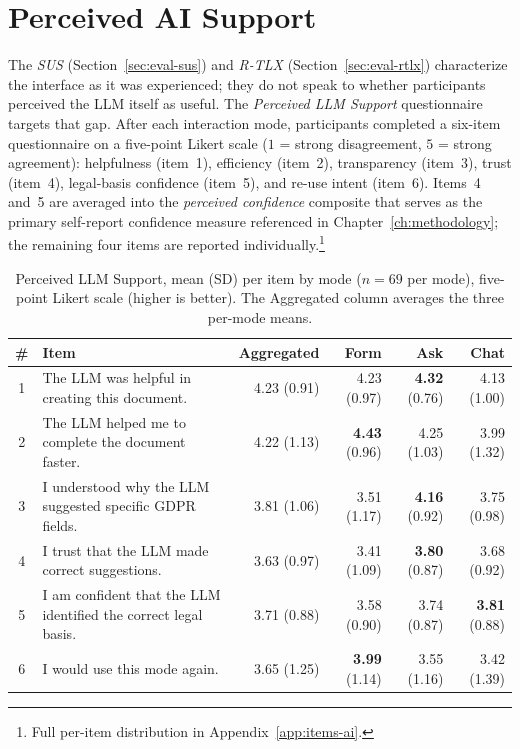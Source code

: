 \section{Perceived AI Support}
\label{sec:eval-ai-support}

The \textit{SUS} (Section~\ref{sec:eval-sus}) and \textit{R-TLX}
(Section~\ref{sec:eval-rtlx}) characterize the interface as it was
experienced; they do not speak to whether participants perceived
the LLM itself as useful.
The \textit{Perceived LLM Support}
questionnaire targets that gap. After each interaction mode,
participants completed a six-item questionnaire on a five-point
Likert scale ($1$ = strong disagreement, $5$ = strong agreement):
helpfulness (item~1), efficiency (item~2), transparency (item~3),
trust (item~4), legal-basis confidence (item~5), and re-use intent
(item~6). Items~4 and~5 are averaged into the \emph{perceived
confidence} composite that serves as the primary self-report
confidence measure referenced in Chapter~\ref{ch:methodology};
the remaining four items are reported individually.\footnote{Full
per-item distribution in Appendix~\ref{app:items-ai}.}

\begin{table}[htbp]
\centering
\small
\begin{tabularx}{\linewidth}{@{}c X r r r r@{}}
\toprule
\# & Item & Aggregated & Form & Ask & Chat \\
\midrule
1 & The LLM was helpful in creating this document. & 4.23 (0.91) & 4.23 (0.97) & \textbf{4.32} (0.76) & 4.13 (1.00) \\
2 & The LLM helped me to complete the document faster. & 4.22 (1.13) & \textbf{4.43} (0.96) & 4.25 (1.03) & 3.99 (1.32) \\
3 & I understood why the LLM suggested specific GDPR fields. & 3.81 (1.06) & 3.51 (1.17) & \textbf{4.16} (0.92) & 3.75 (0.98) \\
4 & I trust that the LLM made correct suggestions. & 3.63 (0.97) & 3.41 (1.09) & \textbf{3.80} (0.87) & 3.68 (0.92) \\
5 & I am confident that the LLM identified the correct legal basis. & 3.71 (0.88) & 3.58 (0.90) & 3.74 (0.87) & \textbf{3.81} (0.88) \\
6 & I would use this mode again. & 3.65 (1.25) & \textbf{3.99} (1.14) & 3.55 (1.16) & 3.42 (1.39) \\
\bottomrule
\end{tabularx}
\caption{Perceived LLM Support, mean (SD) per item by mode
($n = 69$ per mode), five-point Likert scale (higher is better).
The Aggregated column averages the three per-mode means.}
\label{tab:ai-per-item}
\end{table}

